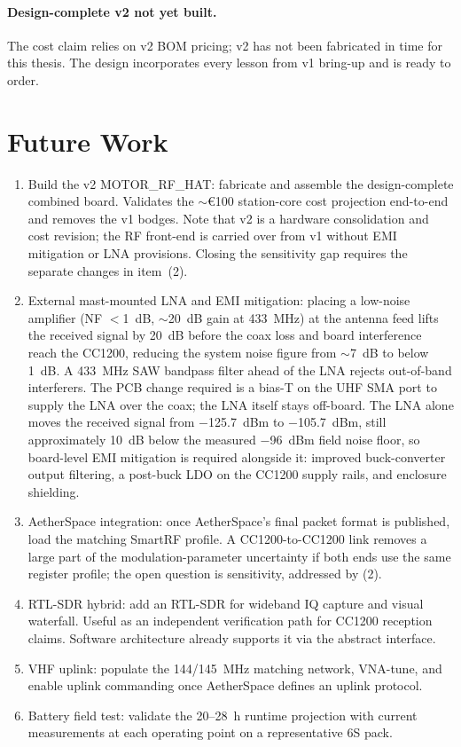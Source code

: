 \paragraph{Design-complete v2 not yet built.}
The cost claim relies on v2 BOM pricing; v2 has not been fabricated in time for this thesis. The design incorporates every lesson from v1 bring-up and is ready to order.

\section{Future Work}
\label{sec:future-work}

\begin{enumerate}
    \item Build the v2 MOTOR\_RF\_HAT: fabricate and assemble the design-complete combined board. Validates the $\sim$€100 station-core cost projection end-to-end and removes the v1 bodges. Note that v2 is a hardware consolidation and cost revision; the RF front-end is carried over from v1 without EMI mitigation or LNA provisions. Closing the sensitivity gap requires the separate changes in item~(2).
    \item External mast-mounted LNA and EMI mitigation: placing a low-noise amplifier (NF $<$1~dB, $\sim$20~dB gain at 433~MHz) at the antenna feed lifts the received signal by 20~dB before the coax loss and board interference reach the CC1200, reducing the system noise figure from $\sim$7~dB to below 1~dB. A 433~MHz SAW bandpass filter ahead of the LNA rejects out-of-band interferers. The PCB change required is a bias-T on the UHF SMA port to supply the LNA over the coax; the LNA itself stays off-board. The LNA alone moves the received signal from $-$125.7~dBm to $-$105.7~dBm, still approximately 10~dB below the measured $-$96~dBm field noise floor, so board-level EMI mitigation is required alongside it: improved buck-converter output filtering, a post-buck LDO on the CC1200 supply rails, and enclosure shielding.
    \item AetherSpace integration: once AetherSpace's final packet format is published, load the matching SmartRF profile. A CC1200-to-CC1200 link removes a large part of the modulation-parameter uncertainty if both ends use the same register profile; the open question is sensitivity, addressed by (2).
    \item RTL-SDR hybrid: add an RTL-SDR for wideband IQ capture and visual waterfall. Useful as an independent verification path for CC1200 reception claims. Software architecture already supports it via the abstract  interface.
    \item VHF uplink: populate the 144/145~MHz matching network, VNA-tune, and enable uplink commanding once AetherSpace defines an uplink protocol.
    \item Battery field test: validate the 20--28~h runtime projection with current measurements at each operating point on a representative 6S pack.
\end{enumerate}

